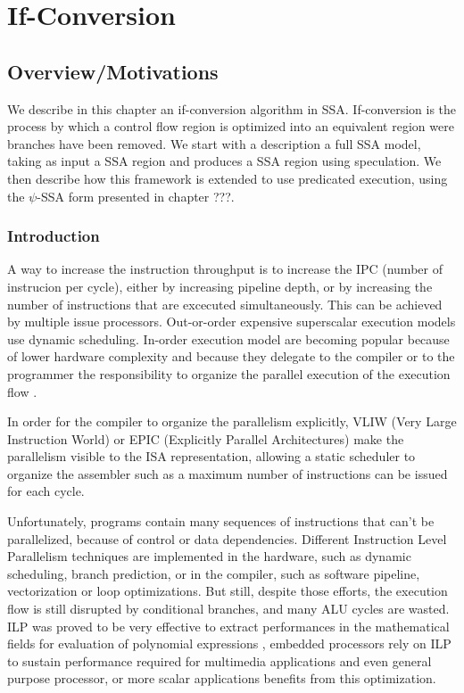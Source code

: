\chapter{If-Conversion }
\graphicspath{{img/}{if_conversion/img/}{part4/if_conversion/img/}}
	
\newcommand\cond{~?~}


\section{Overview/Motivations}

We describe in this chapter an if-conversion algorithm in SSA. If-conversion is the process by which a control flow region is optimized into an equivalent region were branches have been removed. We start with a description a full SSA model, taking as input a SSA region and produces a SSA region using speculation. We then describe how this framework is extended to use predicated execution, using the $\psi$-SSA form presented in chapter ???. 

\subsection{Introduction}

A way to increase the instruction throughput is to increase the IPC (number of instrucion per cycle), either by increasing pipeline depth, or by increasing the number of instructions that are excecuted simultaneously. This can be achieved by multiple issue processors. Out-or-order expensive superscalar execution models use dynamic scheduling. In-order execution model are becoming popular because of lower hardware complexity and because they delegate to the compiler or to the programmer the responsibility to organize the parallel execution of the execution flow \cite{Rau:2003:IP:1074100.1074489}.

In order for the compiler to organize the parallelism explicitly, VLIW (Very Large Instruction World) or EPIC (Explicitly Parallel Architectures) make the parallelism visible to the ISA representation, allowing a static scheduler to organize the assembler such as a maximum number of instructions can be issued for each cycle. 

Unfortunately, programs contain many sequences of instructions that can't be parallelized, because of control or data dependencies. Different Instruction Level Parallelism techniques are implemented in the hardware, such as dynamic scheduling, branch prediction, or in the compiler, such as software pipeline, vectorization or loop optimizations. But still, despite those efforts, the execution flow is still disrupted by conditional branches, and many ALU cycles are wasted. ILP was proved to be very effective to extract performances in the mathematical fields for evaluation of polynomial expressions \cite{Jeannerod:2010:TTI:1837210.1837212}, embedded processors rely on ILP to sustain performance required for multimedia applications \cite{FisherFaraboshiYoung} and even general purpose processor, or more scalar applications benefits from this optimization.

